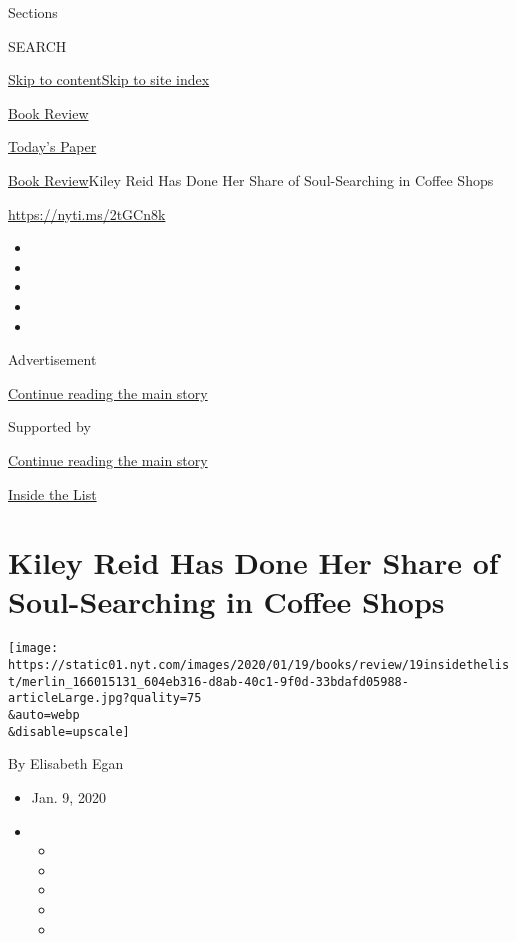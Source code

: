 Sections

SEARCH

\protect\hyperlink{site-content}{Skip to
content}\protect\hyperlink{site-index}{Skip to site index}

\href{https://www.nytimes.com/section/books/review}{Book Review}

\href{https://myaccount.nytimes.com/auth/login?response_type=cookie\&client_id=vi}{}

\href{https://www.nytimes.com/section/todayspaper}{Today's Paper}

\href{/section/books/review}{Book Review}\textbar{}Kiley Reid Has Done
Her Share of Soul-Searching in Coffee Shops

\url{https://nyti.ms/2tGCn8k}

\begin{itemize}
\item
\item
\item
\item
\item
\end{itemize}

Advertisement

\protect\hyperlink{after-top}{Continue reading the main story}

Supported by

\protect\hyperlink{after-sponsor}{Continue reading the main story}

\href{/column/inside-the-list}{Inside the List}

\hypertarget{kiley-reid-has-done-her-share-of-soul-searching-in-coffee-shops}{%
\section{Kiley Reid Has Done Her Share of Soul-Searching in Coffee
Shops}\label{kiley-reid-has-done-her-share-of-soul-searching-in-coffee-shops}}

\texttt{[image: https://static01.nyt.com/images/2020/01/19/books/review/19insidethelist/merlin\_166015131\_604eb316-d8ab-40c1-9f0d-33bdafd05988-articleLarge.jpg?quality=75\\\&auto=webp\\\&disable=upscale]}

By Elisabeth Egan

\begin{itemize}
\item
  Jan. 9, 2020
\item
  \begin{itemize}
  \item
  \item
  \item
  \item
  \item
  \end{itemize}
\end{itemize}

